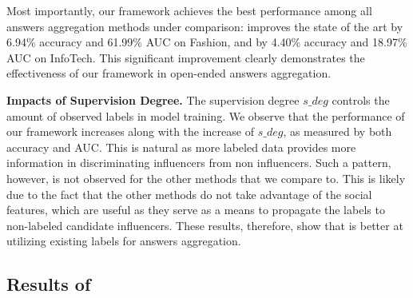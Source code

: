 Most importantly, our framework \sys achieves the best performance among all answers aggregation methods under comparison: \sys improves the state of the art by 6.94\% accuracy and 61.99\% AUC on Fashion, and by 4.40\% accuracy and 18.97\% AUC on InfoTech. This significant improvement clearly demonstrates the effectiveness of our framework in open-ended answers aggregation. 



\smallskip
\noindent\textbf{Impacts of Supervision Degree.} The supervision degree $s\_deg$ controls the amount of observed labels in model training. We observe that the performance of our framework increases along with the increase of $s\_deg$, as measured by both accuracy and AUC. This is natural as more labeled data provides more information in discriminating influencers from non influencers. Such a pattern, however, is not observed for the other methods that we compare to. This is likely due to the fact that the other methods do not take advantage of the social features, which are useful as they serve as a means to propagate the labels to non-labeled candidate influencers. These results, therefore, show that \sys is better at utilizing existing labels for answers aggregation. 

\subsection{Results of \sys}
\label{sec:selfres}

